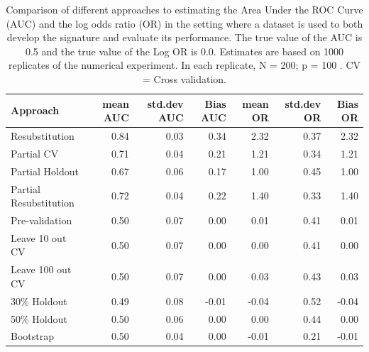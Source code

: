 \documentclass[11pt,]{article}
\begin{document}
\begin{table}

\caption{Comparison of different approaches to estimating the Area Under the ROC Curve (AUC) and the log odds ratio (OR) in the setting where a dataset is used to both develop the signature and evaluate its performance. The true value of the AUC is 0.5 and the true value of the Log OR is 0.0. Estimates are based on 1000 replicates of the numerical experiment. In each replicate,  N = 200; p = 100 . CV = Cross validation. }
\centering
\begin{tabular}[t]{l|r|r|r|r|r|r}
\hline
Approach & mean AUC & std.dev AUC & Bias AUC & mean OR & std.dev OR & Bias OR\\
\hline
Resubstitution & 0.84 & 0.03 & 0.34 & 2.32 & 0.37 & 2.32\\
\hline
Partial CV & 0.71 & 0.04 & 0.21 & 1.21 & 0.34 & 1.21\\
\hline
Partial Holdout & 0.67 & 0.06 & 0.17 & 1.00 & 0.45 & 1.00\\
\hline
Partial Resubstitution & 0.72 & 0.04 & 0.22 & 1.40 & 0.33 & 1.40\\
\hline
Pre-validation & 0.50 & 0.07 & 0.00 & 0.01 & 0.41 & 0.01\\
\hline
Leave 10 out CV & 0.50 & 0.07 & 0.00 & 0.00 & 0.41 & 0.00\\
\hline
Leave 100 out CV & 0.50 & 0.07 & 0.00 & 0.03 & 0.43 & 0.03\\
\hline
30\% Holdout & 0.49 & 0.08 & -0.01 & -0.04 & 0.52 & -0.04\\
\hline
50\% Holdout & 0.50 & 0.06 & 0.00 & 0.00 & 0.44 & 0.00\\
\hline
Bootstrap & 0.50 & 0.04 & 0.00 & -0.01 & 0.21 & -0.01\\
\hline
\end{tabular}
\end{table}
\end{document}
